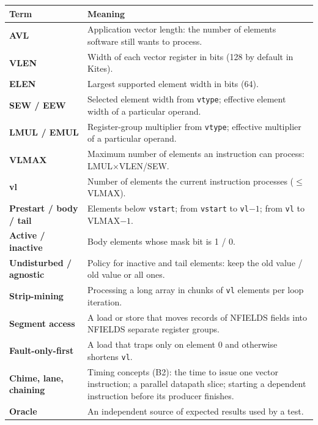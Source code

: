 \documentclass[11pt]{article}
\begin{document}
\small
\begin{longtable}{@{}L{3.6cm}L{11.6cm}@{}}
\toprule
Term & Meaning \\
\midrule
\endhead
\textsf{\textbf{AVL}} & Application vector length: the number of elements software still wants to process. \\
\textsf{\textbf{VLEN}} & Width of each vector register in bits (128 by default in Kites). \\
\textsf{\textbf{ELEN}} & Largest supported element width in bits (64). \\
\textsf{\textbf{SEW / EEW}} & Selected element width from \texttt{vtype}; effective element width of a particular operand. \\
\textsf{\textbf{LMUL / EMUL}} & Register-group multiplier from \texttt{vtype}; effective multiplier of a particular operand. \\
\textsf{\textbf{VLMAX}} & Maximum number of elements an instruction can process: LMUL$\times$VLEN/SEW. \\
\textsf{\textbf{vl}} & Number of elements the current instruction processes ($\le$ VLMAX). \\
\textsf{\textbf{Prestart / body / tail}} & Elements below \texttt{vstart}; from \texttt{vstart} to \texttt{vl}$-1$; from \texttt{vl} to VLMAX$-1$. \\
\textsf{\textbf{Active / inactive}} & Body elements whose mask bit is 1 / 0. \\
\textsf{\textbf{Undisturbed / agnostic}} & Policy for inactive and tail elements: keep the old value / old value or all ones. \\
\textsf{\textbf{Strip-mining}} & Processing a long array in chunks of \texttt{vl} elements per loop iteration. \\
\textsf{\textbf{Segment access}} & A load or store that moves records of NFIELDS fields into NFIELDS separate register groups. \\
\textsf{\textbf{Fault-only-first}} & A load that traps only on element 0 and otherwise shortens \texttt{vl}. \\
\textsf{\textbf{Chime, lane, chaining}} & Timing concepts (B2): the time to issue one vector instruction; a parallel datapath slice; starting a dependent instruction before its producer finishes. \\
\textsf{\textbf{Oracle}} & An independent source of expected results used by a test. \\
\bottomrule
\end{longtable}
\normalsize
\end{document}
